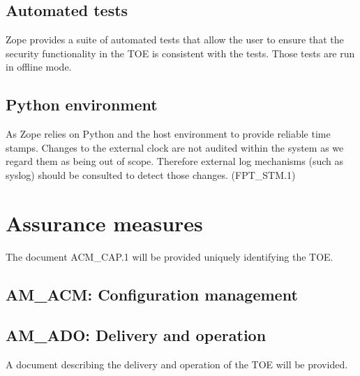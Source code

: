 \documentclass[12pt,english]{scrbook}
\begin{document}


\subsection{Automated tests}

Zope provides a suite of automated tests that allow the user to ensure that the
security functionality in the TOE is consistent with the tests. Those tests are
run in offline mode.





\subsection{Python environment}

As Zope relies on Python and the host environment to provide reliable time
stamps. Changes to the external clock are not audited within the system as we
regard them as being out of scope.  Therefore external log mechanisms (such
as syslog) should be consulted to detect those changes. (FPT{\_}STM.1)



\section{Assurance measures}

The document ACM{\_}CAP.1 will be provided uniquely identifying the TOE.


\subsection{AM{\_}ACM: Configuration management}

\subsection{AM{\_}ADO: Delivery and operation}

A document describing the delivery and operation of the TOE will be provided.


\end{document}
